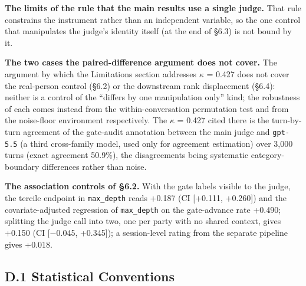 \documentclass[letterpaper]{article}
\begin{document}
\textbf{The limits of the rule that the main results use a single judge.} That rule constrains the instrument rather than an independent variable, so the one control that manipulates the judge's identity itself (at the end of \S{}6.3) is not bound by it.

\textbf{The two cases the paired-difference argument does not cover.} The argument by which the Limitations section addresses $\kappa$ = 0.427 does not cover the real-person control (\S{}6.2) or the downstream rank displacement (\S{}6.4): neither is a control of the ``differs by one manipulation only'' kind; the robustness of each comes instead from the within-conversation permutation test and from the noise-floor environment respectively. The $\kappa$ = 0.427 cited there is the turn-by-turn agreement of the gate-audit annotation between the main judge and \texttt{gpt-5.5} (a third cross-family model, used only for agreement estimation) over 3,000 turns (exact agreement 50.9\%), the disagreements being systematic category-boundary differences rather than noise.

\textbf{The association controls of \S{}6.2.} With the gate labels visible to the judge, the tercile endpoint in \texttt{max\_depth} reads +0.187 (CI [+0.111, +0.260]) and the covariate-adjusted regression of \texttt{max\_depth} on the gate-advance rate +0.490; splitting the judge call into two, one per party with no shared context, gives +0.150 (CI [$-$0.045, +0.345]); a session-level rating from the separate pipeline gives +0.018.





\subsection*{D.1 Statistical Conventions}
\end{document}
